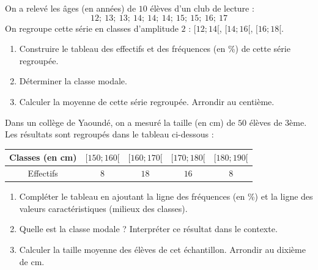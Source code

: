 \documentclass[11pt]{article}
\newcounter{popsec}
\newcounter{popsub}
\newcommand{\courssub}[1]{%
  \stepcounter{popsub}%
  \par\vspace{9pt}\noindent{\popxbold\fontsize{11.5}{13}\selectfont\color{popink}{\color{poporange}\thepopsec.\thepopsub}\hspace{6pt}#1}\par\nopagebreak\vspace{4pt}
}
\begin{document}
\begin{exercice}
On a relevé les âges (en années) de $10$ élèves d'un club de lecture : 
\[ 12;\ 13;\ 13;\ 14;\ 14;\ 14;\ 15;\ 15;\ 16;\ 17 \]
On regroupe cette série en classes d'amplitude $2$ : $[12 ; 14[$, $[14 ; 16[$, $[16 ; 18[$.
\begin{enumerate}
    \item Construire le tableau des effectifs et des fréquences (en \%) de cette série regroupée.
    \item Déterminer la classe modale.
    \item Calculer la moyenne de cette série regroupée. Arrondir au centième.
\end{enumerate}
\end{exercice}

\courssub{Je m'entraîne}

\begin{exercice}
Dans un collège de Yaoundé, on a mesuré la taille (en cm) de $50$ élèves de 3ème. Les résultats sont regroupés dans le tableau ci-dessous :
\begin{center}
\begin{tabular}{|c|c|c|c|c|}\hline
Classes (en cm) & $[150 ; 160[$ & $[160 ; 170[$ & $[170 ; 180[$ & $[180 ; 190[$ \\ \hline
Effectifs & $8$ & $18$ & $16$ & $8$ \\ \hline
\end{tabular}
\end{center}
\begin{enumerate}
    \item Compléter le tableau en ajoutant la ligne des fréquences (en \%) et la ligne des valeurs caractéristiques (milieux des classes).
    \item Quelle est la classe modale ? Interpréter ce résultat dans le contexte.
    \item Calculer la taille moyenne des élèves de cet échantillon. Arrondir au dixième de cm.
\end{enumerate}
\end{exercice}
\end{document}

